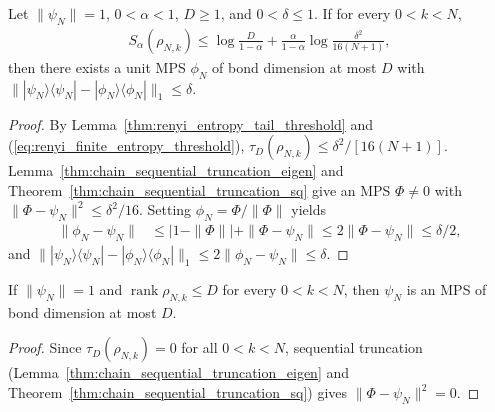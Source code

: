\begin{lemma}
    \label{thm:renyi_finite_mps_approximation}
    \leanok
    Let $\|\psi_N\|=1$, $0<\alpha<1$, $D\ge1$, and $0<\delta\le1$. If for every
    $0<k<N$,
    \begin{align}
        S_\alpha(\rho_{N,k})\le
        \log\frac{D}{1-\alpha}
        +\frac{\alpha}{1-\alpha}\log\frac{\delta^2}{16(N+1)},
        \label{eq:renyi_finite_entropy_threshold}
    \end{align}
    then there exists a unit MPS $\phi_N$ of bond dimension at most $D$ with
    $\||\psi_N\rangle\langle\psi_N|-|\phi_N\rangle\langle\phi_N|\|_1\le\delta$.
\end{lemma}
\begin{proof}
    \leanok
    By Lemma~\ref{thm:renyi_entropy_tail_threshold} and
    (\ref{eq:renyi_finite_entropy_threshold}), $\tau_D(\rho_{N,k})\le\delta^2/[16(N+1)]$.
    Lemma~\ref{thm:chain_sequential_truncation_eigen}
    and Theorem~\ref{thm:chain_sequential_truncation_sq} give an MPS $\Phi\ne0$ with
    $\|\Phi-\psi_N\|^2\le\delta^2/16$. Setting $\phi_N=\Phi/\|\Phi\|$ yields
    \begin{align}
        \|\phi_N-\psi_N\|
         & \le |1-\|\Phi\||+\|\Phi-\psi_N\|
        \le2\|\Phi-\psi_N\|\le\delta/2,
        \label{eq:renyi_normalized_vector_error}
    \end{align}
    and $\||\psi_N\rangle\langle\psi_N|-|\phi_N\rangle\langle\phi_N|\|_1
        \le2\|\phi_N-\psi_N\|\le\delta$.
\end{proof}

\begin{lemma}
    \label{thm:renyi_zero_exact_mps}
    \leanok
    If $\|\psi_N\|=1$ and $\operatorname{rank}\rho_{N,k}\le D$ for every
    $0<k<N$, then $\psi_N$ is an MPS of bond dimension at most $D$.
\end{lemma}
\begin{proof}
    \leanok
    Since $\tau_D(\rho_{N,k})=0$ for all $0<k<N$, sequential truncation
    (Lemma~\ref{thm:chain_sequential_truncation_eigen}
    and Theorem~\ref{thm:chain_sequential_truncation_sq}) gives $\|\Phi-\psi_N\|^2=0$.
\end{proof}

